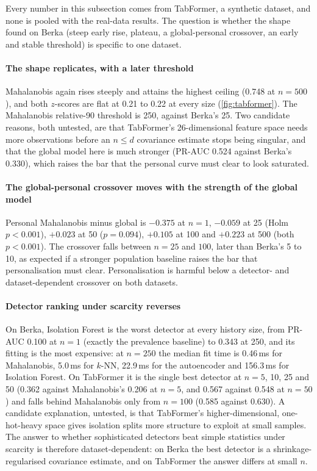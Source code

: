 Every number in this subsection comes from TabFormer, a synthetic dataset, and none is pooled with the real-data results. The question is whether the shape found on Berka (steep early rise, plateau, a global-personal crossover, an early and stable threshold) is specific to one dataset.

\paragraph{The shape replicates, with a later threshold}
Mahalanobis again rises steeply and attains the highest ceiling (0.748 at $n=500$), and both $z$-scores are flat at 0.21 to 0.22 at every size (\cref{fig:tabformer}). The Mahalanobis relative-90 threshold is 250, against Berka's 25. Two candidate reasons, both untested, are that TabFormer's 26-dimensional feature space needs more observations before an $n\le d$ covariance estimate stops being singular, and that the global model here is much stronger (PR-AUC 0.524 against Berka's 0.330), which raises the bar that the personal curve must clear to look saturated.

\paragraph{The global-personal crossover moves with the strength of the global model}
Personal Mahalanobis minus global is $-0.375$ at $n=1$, $-0.059$ at 25 (Holm $p<0.001$), $+0.023$ at 50 ($p=0.094$), $+0.105$ at 100 and $+0.223$ at 500 (both $p<0.001$). The crossover falls between $n=25$ and $100$, later than Berka's 5 to 10, as expected if a stronger population baseline raises the bar that personalisation must clear. Personalisation is harmful below a detector- and dataset-dependent crossover on both datasets.

\paragraph{Detector ranking under scarcity reverses}
On Berka, Isolation Forest is the worst detector at every history size, from PR-AUC 0.100 at $n=1$ (exactly the prevalence baseline) to 0.343 at 250, and its fitting is the most expensive: at $n=250$ the median fit time is 0.46\,ms for Mahalanobis, 5.0\,ms for $k$-NN, 22.9\,ms for the autoencoder and 156.3\,ms for Isolation Forest. On TabFormer it is the single best detector at $n=5$, 10, 25 and 50 (0.362 against Mahalanobis's 0.206 at $n=5$, and 0.567 against 0.548 at $n=50$) and falls behind Mahalanobis only from $n=100$ (0.585 against 0.630). A candidate explanation, untested, is that TabFormer's higher-dimensional, one-hot-heavy space gives isolation splits more structure to exploit at small samples. The answer to whether sophisticated detectors beat simple statistics under scarcity is therefore dataset-dependent: on Berka the best detector is a shrinkage-regularised covariance estimate, and on TabFormer the answer differs at small $n$.

